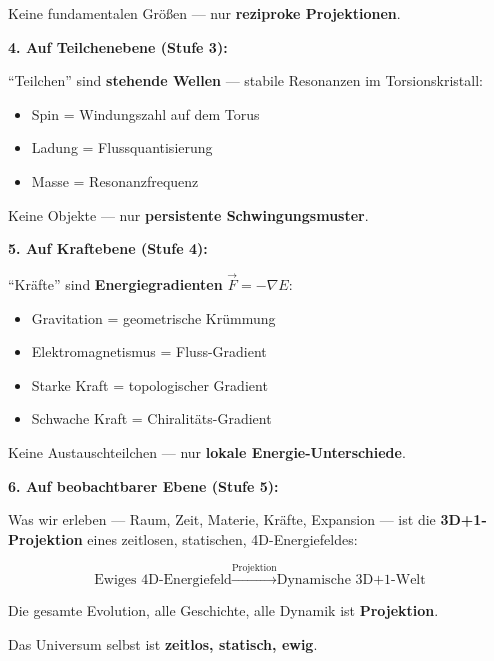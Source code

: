 \begin{revolutionary}
		Keine fundamentalen Größen — nur \textbf{reziproke Projektionen}.

		\vspace{0.5cm}

		\textbf{4. Auf Teilchenebene (Stufe 3):}

		\enquote{Teilchen} sind \textbf{stehende Wellen} — stabile Resonanzen im Torsionskristall:
		\begin{itemize}
			\item Spin = Windungszahl auf dem Torus
			\item Ladung = Flussquantisierung
			\item Masse = Resonanzfrequenz
		\end{itemize}

		\vspace{0.3cm}

		Keine Objekte — nur \textbf{persistente Schwingungsmuster}.

		\vspace{0.5cm}

		\textbf{5. Auf Kraftebene (Stufe 4):}

		\enquote{Kräfte} sind \textbf{Energiegradienten} $\vec{F} = -\nabla E$:
		\begin{itemize}
			\item Gravitation = geometrische Krümmung
			\item Elektromagnetismus = Fluss-Gradient
			\item Starke Kraft = topologischer Gradient
			\item Schwache Kraft = Chiralitäts-Gradient
		\end{itemize}

		\vspace{0.3cm}

		Keine Austauschteilchen — nur \textbf{lokale Energie-Unterschiede}.

		\vspace{0.5cm}

		\textbf{6. Auf beobachtbarer Ebene (Stufe 5):}

		Was wir erleben — Raum, Zeit, Materie, Kräfte, Expansion — ist die \textbf{3D+1-Projektion} eines zeitlosen, statischen, 4D-Energiefeldes:

		\begin{equation}
			\text{Ewiges 4D-Energiefeld} \xrightarrow{\text{Projektion}} \text{Dynamische 3D+1-Welt}
		\end{equation}

		\vspace{0.3cm}

		Die gesamte Evolution, alle Geschichte, alle Dynamik ist \textbf{Projektion}.

		Das Universum selbst ist \textbf{zeitlos, statisch, ewig}.
	\end{revolutionary}

